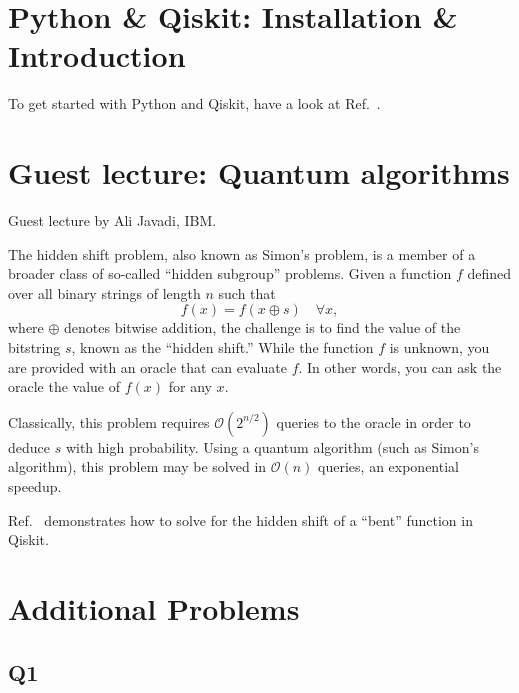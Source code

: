 \documentclass[12pt]{article}
\begin{document}
\begin{appendices}
\section{Python \& Qiskit: Installation \& Introduction}%
\label{sec:python}
To get started with Python and Qiskit, have a look at Ref.~.



\section{Guest lecture: Quantum algorithms}%
\label{sec:quinfo}
Guest lecture by Ali Javadi, IBM.

The hidden shift problem, also known as Simon's problem, is a member of a broader class of so-called ``hidden subgroup'' problems. Given a function $f$ defined over all binary strings of length $n$ such that
\[f(x) = f(x \oplus s) \quad \forall x,\]
where $\oplus$ denotes bitwise addition, the challenge is to find the value of the bitstring $s$, known as the ``hidden shift.'' While the function $f$ is unknown, you are provided with an oracle that can evaluate $f$. In other words, you can ask the oracle the value of $f(x)$ for any $x$.

Classically, this problem requires $\mathcal{O}(2^{n/2})$ queries to the oracle in order to deduce $s$ with high probability.  Using a quantum algorithm (such as Simon's algorithm), this problem may be solved in $\mathcal{O}(n)$ queries, an exponential speedup.

Ref.~ demonstrates how to solve for the hidden shift of a ``bent'' function in Qiskit.

\section{Additional Problems}
\subsection*{Q1}


\end{appendices}
\end{document}
